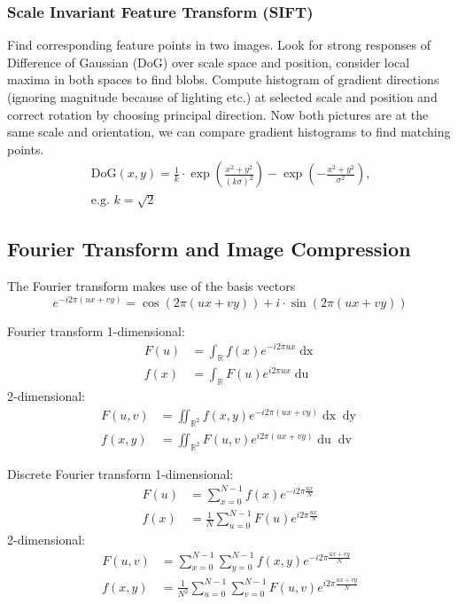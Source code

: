 \documentclass[a4paper,10pt]{article}
\begin{document}
\subsubsection{Scale Invariant Feature Transform (SIFT)}
Find corresponding feature points in two images. Look for strong responses of Difference of Gaussian (DoG) over scale space and position, consider local maxima in both spaces to find blobs. Compute histogram of gradient directions (ignoring magnitude because of lighting etc.) at selected scale and position and correct rotation by choosing principal direction. Now both pictures are at the same scale and orientation, we can compare gradient histograms to find matching points.
\begin{multline*}
    \text{DoG}(x, y) = \frac{1}{k} \cdot \exp\left(\frac{x^2 + y^2}{(k \sigma)^2}\right) - \exp\left(-\frac{x^2 + y^2}{\sigma^2}\right) \text{,} \\ \text{e.g. } k = \sqrt{2}
\end{multline*}

\subsection{Fourier Transform and Image Compression}
The Fourier transform makes use of the basis vectors
\[e^{-i 2 \pi (ux + vy)} = \cos (2 \pi (ux + vy)) + i \cdot \sin(2 \pi (ux + vy))\]
\begin{mainbox}{Fourier transform}	
    1-dimensional:
    \begin{align*}
	   F(u) &= \int_\mathbb{R} f(x) e^{-i 2 \pi ux} \mathop{dx} \\
	   f(x) &= \int_\mathbb{R} F(u) e^{i 2 \pi ux} \mathop{du} \tag{inverse}
    \end{align*}
    2-dimensional: 
    \begin{align*}
	   F(u, v) &= \iint_{\mathbb{R}^2} f(x, y) e^{-i 2 \pi (ux + vy)} \mathop{dx} \mathop{dy} \\
	   f(x, y) &= \iint_{\mathbb{R}^2} F(u, v) e^{i 2 \pi (ux + vy)} \mathop{du} \mathop{dv} \tag{inverse}
    \end{align*}
\end{mainbox}
\begin{mainbox}{Discrete Fourier transform}
    1-dimensional:
    \begin{align*}
        F(u) &= \sum_{x = 0}^{N - 1} f(x) e^{-i 2 \pi \frac{ux}{N}} \\
        f(x) &= \frac{1}{N} \sum_{u = 0}^{N - 1} F(u) e^{i 2 \pi \frac{ux}{N}} \tag{inverse}
    \end{align*}
    2-dimensional:
    \begin{align*}
        F(u, v) &= \sum_{x = 0}^{N - 1} \sum_{y = 0}^{N - 1} f(x, y) e^{-i 2 \pi \frac{ux + vy}{N}} \\
        f(x, y) &= \frac{1}{N^2} \sum_{u = 0}^{N - 1} \sum_{v = 0}^{N - 1} F(u, v) e^{i 2 \pi \frac{ux + vy}{N}} \tag{inverse}
    \end{align*}
\end{mainbox}
\end{document}
